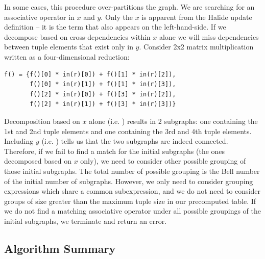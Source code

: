 In some cases, this procedure over-partitions the graph. We are searching for an associative operator in $x$ and $y$. Only the $x$ is apparent from the Halide update definition -- it is the term that also appears on the left-hand-side. If we decompose based on cross-dependencies within $x$ alone we will miss dependencies between tuple elements that exist only in $y$. Consider 2x2 matrix multiplication written as a four-dimensional reduction:

\begin{lstlisting}
f() = {f()[0] * in(r)[0]) + f()[1] * in(r)[2]),
       f()[0] * in(r)[1]) + f()[1] * in(r)[3]),
       f()[2] * in(r)[0]) + f()[3] * in(r)[2]),
       f()[2] * in(r)[1]) + f()[3] * in(r)[3])}
\end{lstlisting}

Decomposition based on $x$ alone (i.e. ) results in 2 subgraphs: one containing the 1st and 2nd tuple elements and one containing the 3rd and 4th tuple elements. Including $y$ (i.e. ) tells us that the two subgraphs are indeed connected. Therefore, if we fail to find a match for the initial subgraphs (the ones decomposed based on $x$ only), we need to consider other possible grouping of those initial subgraphs. The total number of possible grouping is the Bell number of the initial number of subgraphs. However, we only need to consider grouping expressions which share a common subexpression, and we do not need to consider groups of size greater than the maximum tuple size in our precomputed table. If we do not find a matching associative operator under all possible groupings of the initial subgraphs, we terminate and return an error.

\subsection{Algorithm Summary}
\label{subsec:algorithm}

